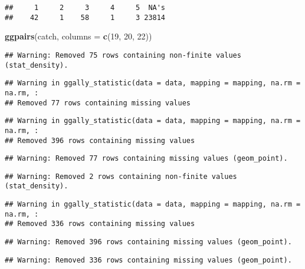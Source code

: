 \documentclass[
]{article}
\newenvironment{Shaded}{\begin{snugshade}}{\end{snugshade}}
\newcommand{\DataTypeTok}[1]{\textcolor[rgb]{0.13,0.29,0.53}{#1}}
\newcommand{\DecValTok}[1]{\textcolor[rgb]{0.00,0.00,0.81}{#1}}
\newcommand{\KeywordTok}[1]{\textcolor[rgb]{0.13,0.29,0.53}{\textbf{#1}}}
\newcommand{\NormalTok}[1]{#1}
\begin{document}
\begin{verbatim}
##     1     2     3     4     5  NA's 
##    42     1    58     1     3 23814
\end{verbatim}

\begin{Shaded}
\begin{Highlighting}[]
\KeywordTok{ggpairs}\NormalTok{(catch, }\DataTypeTok{columns =} \KeywordTok{c}\NormalTok{(}\DecValTok{19}\NormalTok{, }\DecValTok{20}\NormalTok{, }\DecValTok{22}\NormalTok{))}
\end{Highlighting}
\end{Shaded}

\begin{verbatim}
## Warning: Removed 75 rows containing non-finite values (stat_density).
\end{verbatim}

\begin{verbatim}
## Warning in ggally_statistic(data = data, mapping = mapping, na.rm = na.rm, :
## Removed 77 rows containing missing values
\end{verbatim}

\begin{verbatim}
## Warning in ggally_statistic(data = data, mapping = mapping, na.rm = na.rm, :
## Removed 396 rows containing missing values
\end{verbatim}

\begin{verbatim}
## Warning: Removed 77 rows containing missing values (geom_point).
\end{verbatim}

\begin{verbatim}
## Warning: Removed 2 rows containing non-finite values (stat_density).
\end{verbatim}

\begin{verbatim}
## Warning in ggally_statistic(data = data, mapping = mapping, na.rm = na.rm, :
## Removed 336 rows containing missing values
\end{verbatim}

\begin{verbatim}
## Warning: Removed 396 rows containing missing values (geom_point).
\end{verbatim}

\begin{verbatim}
## Warning: Removed 336 rows containing missing values (geom_point).
\end{verbatim}
\end{document}
